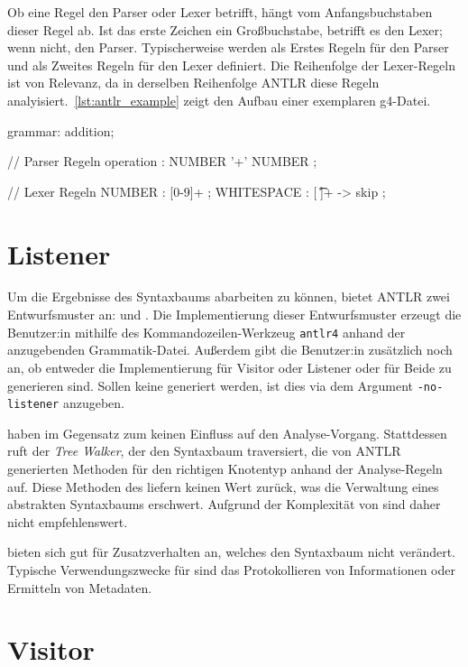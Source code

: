 Ob eine Regel den Parser oder Lexer betrifft, hängt vom Anfangsbuchstaben dieser Regel ab. Ist das erste Zeichen ein Großbuchstabe, betrifft es den Lexer; wenn nicht, den Parser. Typischerweise werden als Erstes Regeln für den Parser und als Zweites Regeln für den Lexer definiert. Die Reihenfolge der Lexer-Regeln ist von Relevanz, da in derselben Reihenfolge ANTLR diese Regeln analyisiert.~\autoref{lst:antlr_example} zeigt den Aufbau einer exemplaren g4-Datei.

\begin{AntlrCode}[numbers=none, caption={Beispielhafter Aufbau einer Grammatik-Definition für Additionen}, label=lst:antlr_example]
grammar: addition;

// Parser Regeln
operation  : NUMBER '+' NUMBER ;

// Lexer Regeln
NUMBER     : [0-9]+ ;
WHITESPACE : [ \t\n\r]+ -> skip ;
\end{AntlrCode}

\section{Listener}

Um die Ergebnisse des Syntaxbaums abarbeiten zu können, bietet ANTLR zwei Entwurfsmuster an: \visitor und \listener. Die Implementierung dieser Entwurfsmuster erzeugt die Benutzer:in mithilfe des Kommandozeilen-Werkzeug \texttt{antlr4} anhand der anzugebenden Grammatik-Datei. Außerdem gibt die Benutzer:in zusätzlich noch an, ob entweder die Implementierung für Visitor oder Listener oder für Beide zu generieren sind. Sollen keine \listener generiert werden, ist dies via dem Argument \texttt{-no-listener} anzugeben.

\listener haben im Gegensatz zum \visitor keinen Einfluss auf den Analyse-Vorgang. Stattdessen ruft der \textit{Tree Walker}, der den Syntaxbaum traversiert, die von ANTLR generierten Methoden für den richtigen Knotentyp anhand der Analyse-Regeln auf. Diese Methoden des \listeners liefern keinen Wert zurück, was die Verwaltung eines abstrakten Syntaxbaums erschwert. Aufgrund der Komplexität von \toya sind \listener daher nicht empfehlenswert.

\listener bieten sich gut für Zusatzverhalten an, welches den Syntaxbaum nicht verändert. Typische Verwendungszwecke für \listener sind das Protokollieren von Informationen oder Ermitteln von Metadaten.

\section{Visitor}

